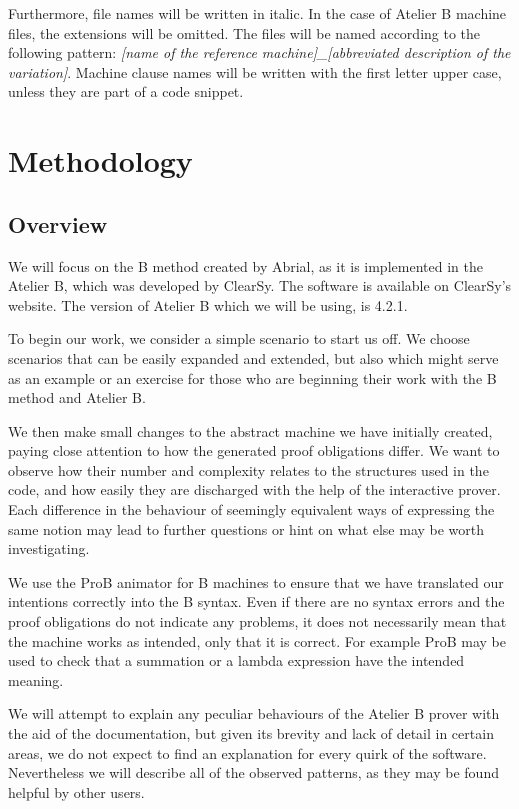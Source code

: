 \documentclass[12pt,journal,duplex]{IEEEtran}
\begin{document}
	Furthermore, file names will be written in italic. In the case of Atelier B machine files, the extensions will be omitted. The files will be named according to the following pattern: \emph{[name of the reference machine]\_[abbreviated description of the variation]}. Machine clause names will be written with the first letter upper case, unless they are part of a code snippet.

	\section{Methodology}
	\subsection{Overview}
	We will focus on the B method created by Abrial, as it is implemented in the Atelier B, which was developed by ClearSy. The software is available on ClearSy's website. The version of Atelier B which we will be using, is 4.2.1.

    To begin our work, we consider a simple scenario to start us off. We choose scenarios that can be easily expanded and extended, but also which might serve as an example or an exercise for those who are beginning their work with the B method and Atelier B.

	We then make small changes to the abstract machine we have initially created, paying close attention to how the generated proof obligations differ. We want to observe how their number and complexity relates to the structures used in the code, and how easily they are discharged with the help of the interactive prover. Each difference in the behaviour of seemingly equivalent ways of expressing the same notion may lead to further questions or hint on what else may be worth investigating.

	We use the ProB animator for B machines to ensure that we have translated our intentions correctly into the B syntax. Even if there are no syntax errors and the proof obligations do not indicate any problems, it does not necessarily mean that the machine works as intended, only that it is correct. For example ProB may be used to check that a summation or a lambda expression have the intended meaning.

	We will attempt to explain any peculiar behaviours of the Atelier B prover with the aid of the documentation, but given its brevity and lack of detail in certain areas, we do not expect to find an explanation for every quirk of the software. Nevertheless we will describe all of the observed patterns, as they may be found helpful by other users.
\end{document}
